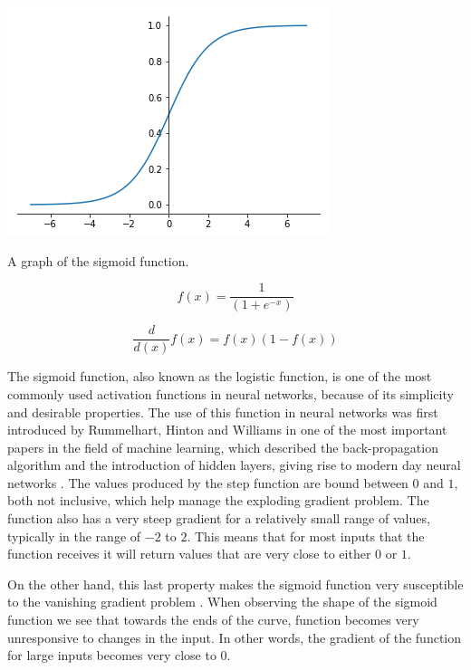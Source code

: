 \begin{marginfigure}
  \includegraphics{graphics/activation_functions/sigmoid_function.png}
  \label{fig:sigmoidfunction}
  \caption{
    A graph of the sigmoid function.
  }
\end{marginfigure}

\begin{equation}\label{sigmoidfunction}
    f(x) = \frac{1}{(1 + e^{-x})}
\end{equation}

\begin{equation}\label{sigmoidfunctionderivative}
    \frac{d}{d(x)}f(x) = f(x)(1-f(x))
\end{equation}

The sigmoid function, also known as the logistic function, is one of the most commonly used activation functions in neural networks, because of its simplicity and desirable properties. The use of this function in neural networks was first introduced by Rummelhart, Hinton and Williams in one of the most important papers in the field of machine learning, which described the back-propagation algorithm and the introduction of hidden layers, giving rise to modern day neural networks \cite{DavidE.Rumelhart1986Lrbb}. \newline The values produced by the step function are bound between $0$ and $1$, both not inclusive, which help manage the exploding gradient problem. The function also has a very steep gradient for a relatively small range of values, typically in the range of $-2$ to $2$. This means that for most inputs that the function receives it will return values that are very close to either $0$ or $1$.

On the other hand, this last property makes the sigmoid function very susceptible to the vanishing gradient problem \newline \cite{bengio94}. When observing the shape of the sigmoid function we see that towards the ends of the curve, function becomes very unresponsive to changes in the input. In other words, the gradient of the function for large inputs becomes very close to $0$. 


